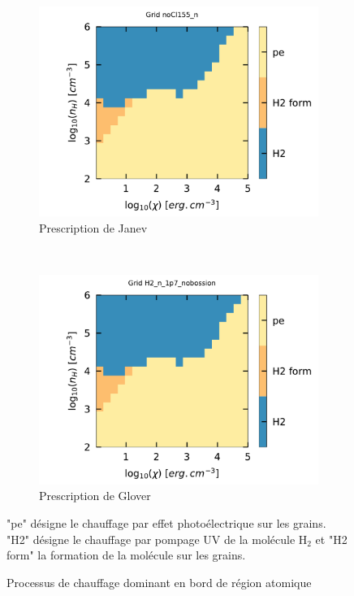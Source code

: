 \begin{appendices}
\begin{figure}[!p]
    \centering
    \begin{subfigure}[t]{0.49\textwidth} %
        \centering \includegraphics[trim = {0 0 0 1cm },clip,width=1\textwidth]{figure/H2/grid_janev/mapGmax.pdf}
        \caption{Prescription de Janev}
    \end{subfigure}
    ~ 
    \begin{subfigure}[t]{0.49\textwidth}
        \centering \includegraphics[trim = {0 0 0 1cm },clip,width=1\textwidth]{figure/H2/grid_glover/mapGmax.pdf}
        \caption{Prescription de Glover}
    \end{subfigure}
    \caption{Processus de chauffage dominant en bord de région atomique}
    \begin{minipage}{\textwidth}
    "pe" désigne le chauffage par effet photoélectrique sur les grains. "H2" désigne le chauffage par pompage UV de la molécule $\mathrm{H}_2$ et "H2 form" la formation de la molécule sur les grains.
    \end{minipage}
    \label{fig:H2:JanevGlover:Gmax}
    \hspace{1em}
    

\end{figure}
\end{appendices}
